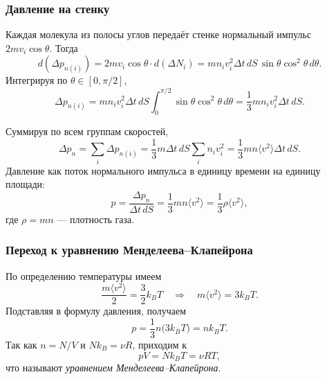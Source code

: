 \documentclass[12pt, a4paper]{article}%
\begin{document}
\subsubsection*{Давление на стенку}
Каждая молекула из полосы углов передаёт стенке нормальный импульс \(2 m v_i \cos\theta\). Тогда
\[
d(\Delta p_{n(i)}) = 2 m v_i \cos\theta \cdot d(\Delta N_i)
= m n_i v_i^2 \Delta t\, dS\, \sin\theta \cos^2\theta\, d\theta.
\]
Интегрируя по \(\theta\in[0,\pi/2]\),
\[
\Delta p_{n(i)} = m n_i v_i^2 \Delta t\, dS \int_{0}^{\pi/2} \sin\theta \cos^2\theta\, d\theta
= \frac13 m n_i v_i^2 \Delta t\, dS.
\]


Суммируя по всем группам скоростей,
\[
\Delta p_n = \sum_i \Delta p_{n(i)} = \frac13 m \Delta t\, dS \sum_i n_i v_i^2
= \frac13 m n \langle v^2 \rangle \Delta t\, dS.
\]
Давление как поток нормального импульса в единицу времени на единицу площади:
\[
p = \frac{\Delta p_n}{\Delta t\, dS} = \frac13 m n \langle v^2 \rangle = \frac13 \rho \langle v^2 \rangle,
\]
где \(\rho = m n\) —  плотность газа.

\subsubsection*{Переход к уравнению Менделеева–Клапейрона}
По определению температуры имеем
\[
\frac{m \langle v^2 \rangle}{2} = \frac{3}{2} k_B T \quad \Rightarrow \quad m \langle v^2 \rangle = 3 k_B T.
\]
Подставляя в формулу давления, получаем
\[
p = \frac13 n \bigl(3 k_B T\bigr) = n k_B T.
\]
Так как \(n = N/V\) и \(N k_B = \nu R\), приходим к
\[
p V = N k_B T = \nu R T,
\]
что называют \textit{уравнением Менделеева–Клапейрона}.
\end{document}
